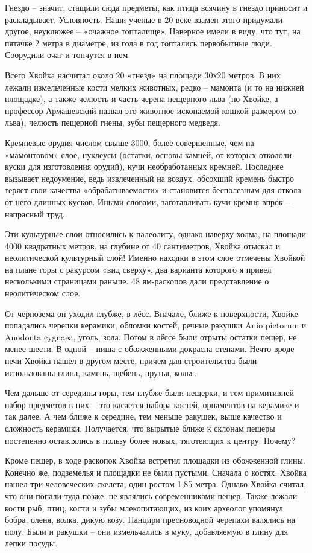 Гнездо – значит, стащили сюда предметы, как птица всячину в гнездо приносит и раскладывает. Условность. Наши ученые в 20 веке взамен этого придумали другое, неуклюжее – «очажное топталище». Наверное имели в виду, что тут, на пятачке 2 метра в диаметре, из года в год топтались первобытные люди. Соорудили очаг и топчутся в нем.

Всего Хвойка насчитал около 20 «гнезд» на площади 30х20 метров. В них лежали измельченные кости мелких животных, редко – мамонта (и то на нижней площадке), а также челюсть и часть черепа пещерного льва (по Хвойке, а профессор Армашевский назвал это животное ископаемой кошкой размером со льва), челюсть пещерной гиены, зубы пещерного медведя.

Кремневые орудия числом свыше 3000, более совершенные, чем на «мамонтовом» слое, нуклеусы (остатки, основы камней, от которых откололи куски для изготовления орудий), кучи необработанных кремней. Последнее вызывает недоумение, ведь извлеченный на воздух, обсохший кремень быстро теряет свои качества «обрабатываемости» и становится бесполезным для откола от него длинных кусков. Иными словами, заготавливать кучи кремня впрок – напрасный труд.

Эти культурные слои относились к палеолиту, однако наверху холма, на площади 4000 квадратных метров, на глубине от 40 сантиметров, Хвойка отыскал и неолитической культурный слой! Именно находки в этом слое отмечены Хвойкой на плане горы с ракурсом «вид сверху», два варианта которого я привел несколькими страницами раньше. 48 ям-раскопов дали представление о неолитическом слое.

От чернозема он уходил глубже, в лёсс. Вначале, ближе к поверхности, Хвойке попадались черепки керамики, обломки костей, речные ракушки Anio pictorum и Anodonta cygnaea, уголь, зола. Потом в лёссе были отрыты остатки пещер, не менее шести. В одной – ниша с обожженными докрасна стенами. Нечто вроде печи Хвойка нашел в другом месте, причем для строительства были использованы глина, камень, щебень, прутья, колья.

Чем дальше от середины горы, тем глубже были пещерки, и тем примитивней набор предметов в них – это касается набора костей, орнаментов на керамике и так далее. А чем ближе к середине, тем меньше ракушек, выше качество и сложность керамики. Получается, что вырытые ближе к склонам пещеры постепенно оставлялись в пользу более новых, тяготеющих к центру. Почему?

Кроме пещер, в ходе раскопок Хвойка встретил площадки из обожженной глины. Конечно же, подземелья и площадки не были пустыми. Сначала о костях. Хвойка нашел три человеческих скелета, один ростом 1,85 метра. Однако Хвойка считал, что они попали туда позже, не являлись современниками пещер. Также лежали кости рыб, птиц, кости и зубы млекопитающих, из коих археолог упомянул бобра, оленя, волка, дикую козу. Панцири пресноводной черепахи валялись на полу. Были и ракушки – они измельчались в муку, добавляемую в глину для лепки посуды.

